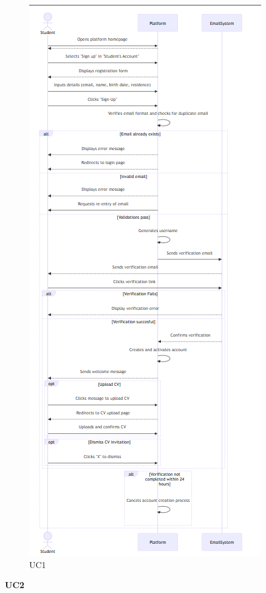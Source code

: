 \begin{figure}[H]
    \centering
    \includegraphics[width=0.5\linewidth]{RASD//Images/UC1.png}
    \caption{UC1}
\end{figure}

\pagebreak
\textbf{UC2}

